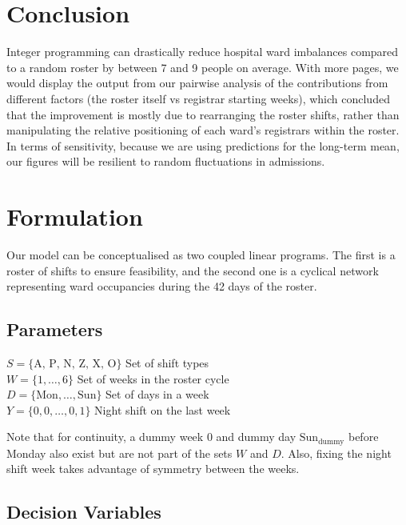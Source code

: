 \documentclass[a4paper]{article}
\begin{document}
\section{Conclusion}

Integer programming can drastically reduce hospital ward imbalances compared to a random roster by between 7 and 9 people on average. With more pages, we would display the output from our pairwise analysis of the contributions from different factors (the roster itself vs registrar starting weeks), which concluded that the improvement is mostly due to rearranging the roster shifts, rather than manipulating the relative positioning of each ward's registrars within the roster. In terms of sensitivity, because we are using predictions for the long-term mean, our figures will be resilient to random fluctuations in admissions.

\newpage
\appendix
\section{Formulation}

Our model can be conceptualised as two coupled linear programs. The first is a roster of shifts to ensure feasibility, and the second one is a cyclical network representing ward occupancies during the 42 days of the roster.

\subsection{Parameters}
\begin{multicols}{2}
\noindent


$S = \{\text{A, P, N, Z, X, O}\}$ \dotfill Set of shift types\\
$W = \{1, \dots, 6\}$ \dotfill Set of weeks in the roster cycle\\
$D = \{\text{Mon},\dots,\text{Sun}\}$ \dotfill Set of days in a week\\
$Y  = \{0, 0,\dots, 0, 1\}$ \dotfill Night shift on the last week

Note that for continuity, a dummy week $0$ and dummy day $\text{Sun}_\text{dummy}$ before Monday also exist but are not part of the sets $W$ and $D$. Also, fixing the night shift week takes advantage of symmetry between the weeks.
\end{multicols}
\subsection{Decision Variables}
\end{document}
